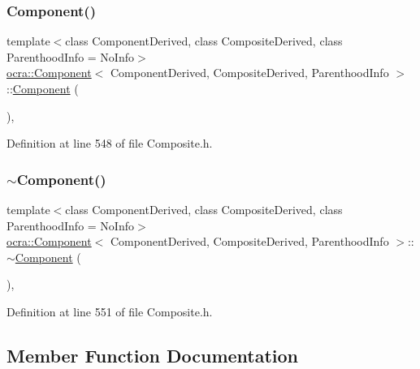 \subsubsection{\texorpdfstring{Component()}{Component()}}
{\footnotesize\ttfamily template$<$class Component\+Derived, class Composite\+Derived, class Parenthood\+Info = No\+Info$>$ \\
\hyperlink{classocra_1_1Component}{ocra\+::\+Component}$<$ Component\+Derived, Composite\+Derived, Parenthood\+Info $>$\+::\hyperlink{classocra_1_1Component}{Component} (\begin{DoxyParamCaption}{ }\end{DoxyParamCaption})\hspace{0.3cm}{\ttfamily [inline]}, {\ttfamily [protected]}}



Definition at line 548 of file Composite.\+h.

\hypertarget{classocra_1_1Component_a616d0b940599b102fa630107ec169e58}{}\label{classocra_1_1Component_a616d0b940599b102fa630107ec169e58} 
\subsubsection{\texorpdfstring{$\sim$\+Component()}{~Component()}}
{\footnotesize\ttfamily template$<$class Component\+Derived, class Composite\+Derived, class Parenthood\+Info = No\+Info$>$ \\
\hyperlink{classocra_1_1Component}{ocra\+::\+Component}$<$ Component\+Derived, Composite\+Derived, Parenthood\+Info $>$\+::$\sim$\hyperlink{classocra_1_1Component}{Component} (\begin{DoxyParamCaption}{ }\end{DoxyParamCaption})\hspace{0.3cm}{\ttfamily [inline]}, {\ttfamily [protected]}}



Definition at line 551 of file Composite.\+h.



\subsection{Member Function Documentation}
\hypertarget{classocra_1_1Component_abc5066cb5523dd4ee8782ab7f75a26d5}{}\label{classocra_1_1Component_abc5066cb5523dd4ee8782ab7f75a26d5} 
